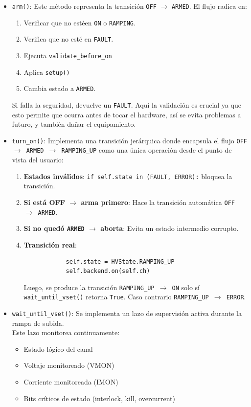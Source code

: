 \documentclass{article}
\begin{document}
\begin{itemize}
    \item \texttt{arm()}: Este método representa la transición \texttt{OFF} $\to$ \texttt{ARMED}. 
    El flujo radica en:
    \begin{enumerate}
        \item Verificar que no estéen \texttt{ON} o \texttt{RAMPING}.
        \item Verifica que no esté en \texttt{FAULT}.
        \item Ejecuta \texttt{validate\_before\_on}
        \item Aplica \texttt{setup()}
        \item Cambia estado a \texttt{ARMED}.
    \end{enumerate}
    Si falla la seguridad, devuelve un \texttt{FAULT}. Aquí la validación es crucial ya que esto permite que ocurra antes de tocar el hardware, así se evita problemas a futuro, y también dañar el equipamiento. \\
    
    \item \texttt{turn\_on()}: Implementa una transición jerárquica donde encapsula el flujo \texttt{OFF $\to$ ARMED $\to$ RAMPING\_UP} como una única operación desde el punto de vista del usuario:
    \begin{enumerate}
        \item \textbf{Estados inválidos}: \texttt{if self.state in (FAULT, ERROR):} bloquea la transición.

        \item \textbf{Si está OFF $\to$ arma primero}: Hace la transición automática \texttt{OFF $\to$ ARMED}.

        \item \textbf{Si no quedó \texttt{ARMED} $\to$ aborta}: Evita un estado intermedio corrupto.

        \item \textbf{Transición real}:
        \begin{lstlisting}
            self.state = HVState.RAMPING_UP
            self.backend.on(self.ch)
        \end{lstlisting}
        Luego, se produce la transición \texttt{RAMPING\_UP $\to$ ON} solo sí \texttt{wait\_until\_vset()} retorna \texttt{True}. 
        Caso contrario \texttt{RAMPING\_UP $\to$ ERROR}.
    \end{enumerate}

    \item \texttt{wait\_until\_vset()}: Se implementa un lazo de supervisión activa durante la rampa de subida.\\
    Este lazo monitorea continuamente:
    \begin{itemize}
        \item Estado lógico del canal
        \item Voltaje monitoreado (VMON)
        \item Corriente monitoreada (IMON)
        \item Bits críticos de estado (interlock, kill, overcurrent)
    \end{itemize}


\end{itemize}
\end{document}
